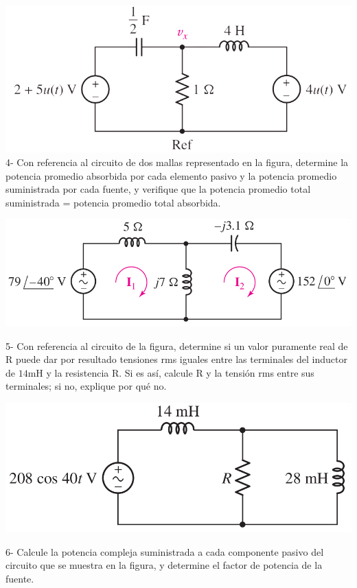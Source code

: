 \documentclass[10pt,letterpaper]{article}
\begin{document}
\includegraphics[scale=0.45]{c3} \\

4- Con referencia al circuito de dos mallas representado en la figura, determine la potencia promedio absorbida por cada elemento pasivo y la potencia promedio suministrada por cada fuente, y verifique que la potencia promedio total suministrada = potencia promedio total absorbida.

\includegraphics[scale=0.4]{c_p1}

5- Con referencia al circuito de la figura, determine si un valor puramente real de R puede dar por resultado tensiones rms iguales entre las terminales del inductor de $14 \mathrm{mH}$ y la resistencia R. Si es así, calcule R y la tensión rms entre sus terminales; si no, explique por qué no.

\includegraphics[scale=0.3]{c_p2}

6- Calcule la potencia compleja suministrada a cada componente pasivo del circuito que se muestra en la figura, y determine el factor de potencia de la fuente.
\end{document}

